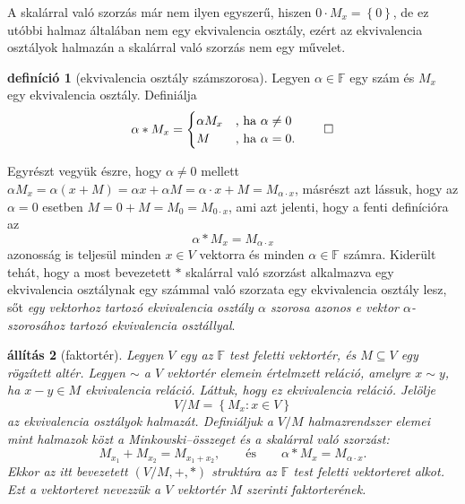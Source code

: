 \documentclass[9pt, a4paper, showtrims]{memoir}
\theoremstyle{plain}
\newtheorem{proposition}{állítás}[chapter]
\theoremstyle{remark}
\theoremstyle{definition}
\newtheorem{definition}[proposition]{definíció}
\begin{document}
    A skalárral való szorzás már nem ilyen egyszerű,
    hiszen $0\cdot M_x=\left\{ 0 \right\}$, de ez utóbbi halmaz általában nem egy ekvivalencia osztály,
    ezért az ekvivalencia osztályok halmazán a skalárral való szorzás nem egy művelet.
    \begin{definition}[ekvivalencia osztály számszorosa]
        Legyen $\alpha\in\mathbb{F}$ egy szám és $M_{x}$ egy ekvivalencia osztály.
        Definiálja
        \[
            \alpha\ast M_x=
            \begin{cases}
                \alpha M_x&\text{, ha }\alpha\neq 0\\
                M&\text{, ha }\alpha=0.
            \end{cases}\qedhere
        \]
    \end{definition}
    Egyrészt vegyük észre,
    hogy $\alpha\neq 0$ mellett
    $\alpha M_x=\alpha\left( x+M \right)=\alpha x+\alpha M=\alpha\cdot x+M=M_{\alpha\cdot x}$,
    másrészt azt lássuk, 
    hogy az $\alpha=0$ esetben
    $M=0+M=M_0=M_{0\cdot x}$, ami azt jelenti, hogy a fenti definícióra az
    \[
        \alpha\ast M_x=M_{\alpha\cdot x}\tag{\ddag}
    \]
    azonosság is teljesül minden $x\in V$ vektorra és minden $\alpha\in\mathbb{F}$ számra.
    Kiderült tehát, hogy a most bevezetett $\ast$ skalárral való szorzást alkalmazva
    egy ekvivalencia osztálynak egy számmal való szorzata egy ekvivalencia osztály lesz,
    sőt
    \emph{egy vektorhoz tartozó ekvivalencia osztály $\alpha$ szorosa azonos e vektor $\alpha$-szorosához tartozó
    ekvivalencia osztállyal}.
    \begin{proposition}[faktortér]
    Legyen $V$ egy az $\mathbb{F}$ test feletti vektortér,
    és $M\subseteq V$ egy rögzített altér.
    Legyen $\sim$ a $V$ vektortér elemein értelmzett reláció,
    amelyre $x\sim y$, ha $x-y\in M$ ekvivalencia reláció.
    Láttuk, hogy ez ekvivalencia reláció.
    Jelölje
    \[
        V/M=\left\{ M_x:x\in V \right\}
    \]
    az ekvivalencia osztályok halmazát.
    Definiáljuk a $V/M$ halmazrendszer elemei mint halmazok közt
    a Minkowski--összeget és a skalárral való szorzást:
    \[
        M_{x_1}+M_{x_2}=M_{x_1+x_2},
        \qquad
        \text{és}
        \qquad
        \alpha\ast M_x=M_{\alpha\cdot x}.
    \]
    Ekkor az itt bevezetett $(V/M,+,\ast)$ struktúra az $\mathbb{F}$ test feletti vektorteret alkot.
    Ezt a vektorteret nevezzük a $V$ vektortér $M$ szerinti \emph{faktorterének}.
\end{proposition}
\end{document}
